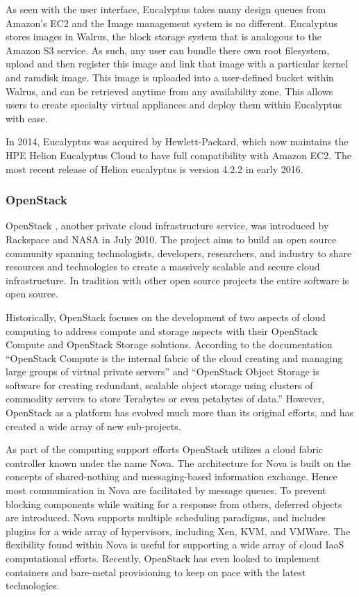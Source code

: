 As seen with the user interface, Eucalyptus takes many design queues from Amazon’s EC2 and the Image management system is no different.  Eucalyptus stores images in Walrus, the block storage system that is analogous to the Amazon S3 service.  As such, any user can bundle there own root filesystem, upload and then register this image and link that image with a particular kernel and ramdisk image.  This image is uploaded into a user-defined bucket within Walrus, and can be retrieved anytime from any availability zone.  This allows users to create specialty virtual appliances and deploy them within Eucalyptus with ease.  

In 2014, Eucalyptus was acquired by Hewlett-Packard, which now maintains the HPE Helion Eucalyptus Cloud to have full compatibility with Amazon EC2. The most recent release of Helion eucalyptus is version 4.2.2 in early 2016.  

\subsubsection{OpenStack}

OpenStack \cite{www/openstack, sefraoui2012openstack}, another private cloud infrastructure service, was introduced by Rackspace and NASA in July 2010. The project aims to build an open source community spanning technologists, developers, researchers, and industry to share resources and technologies to create a massively scalable and secure cloud infrastructure. In tradition with other open source projects the entire software is open source. 

 
Historically, OpenStack focuses on the development of two aspects of cloud computing to address compute and storage aspects with their OpenStack Compute and OpenStack Storage solutions. According to the documentation ``OpenStack Compute is the internal fabric of the cloud creating and managing large groups of virtual private servers'' and ``OpenStack Object Storage is software for creating redundant, scalable object storage using clusters of commodity servers to store Terabytes or even petabytes of data.''    However, OpenStack as a platform has evolved much more than its original efforts, and has created a wide array of new sub-projects. 

As part of the computing support efforts OpenStack  utilizes a cloud fabric controller known under the name Nova. The architecture for Nova is built on the concepts of  shared-nothing and  messaging-based information exchange. Hence most communication in Nova are facilitated by message queues. To prevent blocking components while waiting for a response from others, deferred objects are introduced.  Nova supports multiple scheduling paradigms, and includes plugins for a wide array of hypervisors, including Xen, KVM, and VMWare.  The flexibility found within Nova is useful for supporting a wide array of cloud IaaS computational efforts. Recently, OpenStack has even looked to implement containers and bare-metal provisioning to keep on pace with the latest technologies.  

